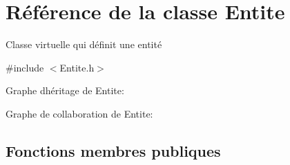 \hypertarget{class_entite}{}\section{Référence de la classe Entite}
\label{class_entite}


Classe virtuelle qui définit une entité  




{\ttfamily \#include $<$Entite.\+h$>$}



Graphe d\textquotesingle{}héritage de Entite\+:


Graphe de collaboration de Entite\+:
\subsection*{Fonctions membres publiques}
